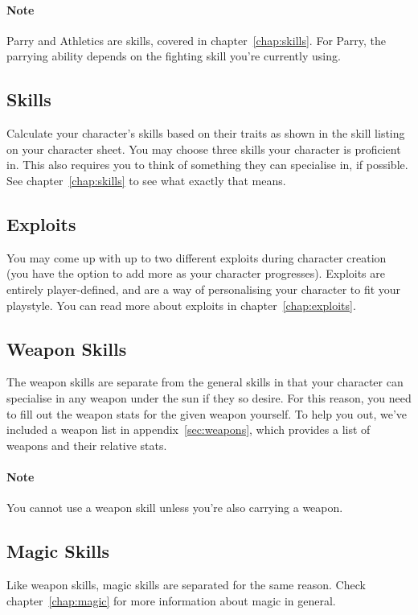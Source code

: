 \paragraph{Note} Parry and Athletics are skills, covered in chapter~\ref{chap:skills}.
For Parry, the parrying ability depends on the fighting skill you're currently using.

\subsection{Skills}
Calculate your character's skills based on their traits as shown in the skill listing on your character sheet.
You may choose three skills your character is proficient in.
This also requires you to think of something they can specialise in, if possible.
See chapter~\ref{chap:skills} to see what exactly that means.

\subsection{Exploits}
You may come up with up to two different exploits during character creation (you have the option to add more as your character progresses).
Exploits are entirely player-defined, and are a way of personalising your character to fit your playstyle.
You can read more about exploits in chapter~\ref{chap:exploits}.

\subsection{Weapon Skills}
The weapon skills are separate from the general skills in that your character can specialise in any weapon under the sun if they so desire.
For this reason, you need to fill out the weapon stats for the given weapon yourself.
To help you out, we've included a weapon list in appendix~\ref{sec:weapons}, which provides a list of weapons and their relative stats.

\paragraph{Note} You cannot use a weapon skill unless you're also carrying a weapon.

\subsection{Magic Skills}
Like weapon skills, magic skills are separated for the same reason.
Check chapter~\ref{chap:magic} for more information about magic in general.


